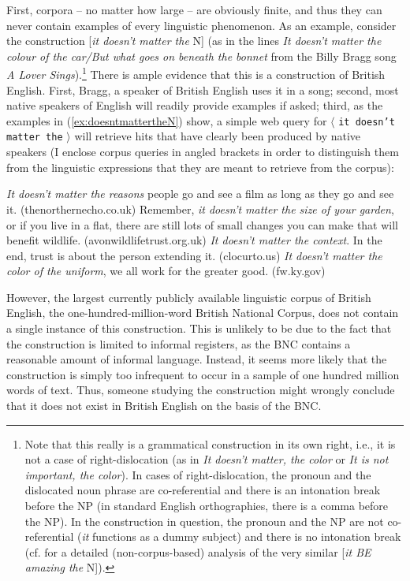 First, corpora -- no matter how large -- are obviously finite, and thus they can never contain examples of every linguistic phenomenon. As an example, consider the construction [\textit{it doesn't matter the} N] (as in the lines \textit{It doesn't matter the colour of the car/But what goes on beneath the bonnet} from the Billy Bragg song \textit{A Lover Sings}).\footnote{Note that this really is a grammatical construction in its own right, i.e., it is not a case of right-dislocation (as in \textit{It doesn't matter, the color} or \textit{It is not important, the color}). In cases of right-dislocation, the pronoun and the dislocated noun phrase are co-referential and there is an intonation break before the NP (in standard English orthographies, there is a comma before the NP). In the construction in question, the pronoun and the NP are not co-referential (\textit{it} functions as a dummy subject) and there is no intonation break (cf. \citet{michaelis_toward_1996} for a detailed (non-corpus-based) analysis of the very similar [\textit{it BE amazing the} N]).} There is ample evidence that this is a construction of British English. First, Bragg, a speaker of British English uses it in a song; second, most native speakers of English will readily provide examples if asked; third, as the examples in (\ref{ex:doesntmattertheN}) show, a simple web query for $\langle$ \texttt{\textquotedbl it doesn't matter the\textquotedbl} $\rangle$ will retrieve hits that have clearly been produced by native speakers (I enclose corpus queries in angled brackets in order to distinguish them from the linguistic expressions that they are meant to retrieve from the corpus):

\begin{exe}
\ex
\begin{xlist} 
\label{ex:doesntmattertheN}
\ex \textit{It doesn't matter the reasons} people go and see a film as long as they go and see it. (thenorthernecho.co.uk)
\ex Remember, \textit{it doesn't matter the size of your garden}, or if you live in a flat, there are still lots of small changes you can make that will benefit wildlife. (avonwildlifetrust.org.uk)
\ex \textit{It doesn't matter the context}. In the end, trust is about the person extending it. (clocurto.us)
\ex \textit{It doesn't matter the color of the uniform}, we all work for the greater good. (fw.ky.gov)
\end{xlist}
\end{exe}

However, the largest currently publicly available linguistic corpus of British English, the one-hundred-million-word British National Corpus, does not contain a single instance of this construction. This is unlikely to be due to the fact that the construction is limited to informal registers, as the BNC contains a reasonable amount of informal language. Instead, it seems more likely that the construction is simply too infrequent to occur in a sample of one hundred million words of text. Thus, someone studying the construction might wrongly conclude that it does not exist in British English on the basis of the BNC.

